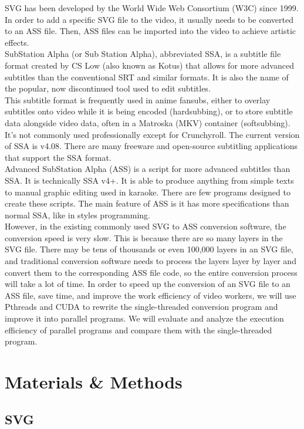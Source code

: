 \documentclass[10pt,twocolumn,letterpaper]{article}
\begin{document}
SVG has been developed by the World Wide Web Consortium (W3C) since 1999. In order to add a specific SVG file to the video, it usually needs to be converted to an ASS file. Then, ASS files can be imported into the video to achieve artistic effects. \\
SubStation Alpha (or Sub Station Alpha), abbreviated SSA, is a subtitle file format created by CS Low (also known as Kotus) that allows for more advanced subtitles than the conventional SRT and similar formats. It is also the name of the popular, now discontinued tool used to edit subtitles. \\
This subtitle format is frequently used in anime fansubs, either to overlay subtitles onto video while it is being encoded (hardsubbing), or to store subtitle data alongside video data, often in a Matroska (MKV) container (softsubbing). It's not commonly used professionally except for Crunchyroll.
The current version of SSA is v4.08. There are many freeware and open-source subtitling applications that support the SSA format. \\
Advanced SubStation Alpha (ASS) is a script for more advanced subtitles than SSA. It is technically SSA v4+. It is able to produce anything from simple texts to manual graphic editing used in karaoke. There are few programs designed to create these scripts. The main feature of ASS is it has more specifications than normal SSA, like in styles programming. \\
However, in the existing commonly used SVG to ASS conversion software, the conversion speed is very slow. This is because there are so many layers in the SVG file. There may be tens of thousands or even 100,000 layers in an SVG file, and traditional conversion software needs to process the layers layer by layer and convert them to the corresponding ASS file code, so the entire conversion process will take a lot of time. In order to speed up the conversion of an SVG file to an ASS file, save time, and improve the work efficiency of video workers, we will use Pthreads and CUDA to rewrite the single-threaded conversion program and improve it into parallel programs. We will evaluate and analyze the execution efficiency of parallel programs and compare them with the single-threaded program.


\section{Materials \& Methods}

\subsection{SVG}
\end{document}
